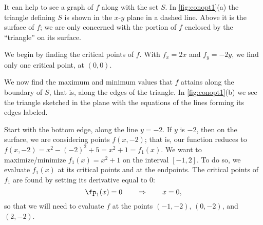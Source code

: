 {It can help to see a graph of $f$ along with the set $S$. In \autoref{fig:conopt1}(a) the triangle defining $S$ is shown in the $x$-$y$ plane in a dashed line. Above it is the surface of $f$; we are only concerned with the portion of $f$ enclosed by the ``triangle'' on its surface. 

We begin by finding the critical points of $f$. With $f_x = 2x$ and $f_y = -2y$, we find only one critical point, at $(0,0)$. 

We now find the maximum and minimum values that $f$ attains along the boundary of $S$, that is, along the edges of the triangle. In \autoref{fig:conopt1}(b) we see the triangle sketched in the plane with the equations of the lines forming its edges labeled. 

Start with the bottom edge, along the line $y=-2$. If $y$ is $-2$, then on the surface, we are considering points $f(x,-2)$; that is, our function reduces to $f(x,-2) = x^2-(-2)^2+5 = x^2+1=f_1(x)$. We want to maximize/minimize $f_1(x)=x^2+1$ on the interval $[-1,2]$. To do so, we evaluate $f_1(x)$ at its critical points and at the endpoints.  The critical points of $f_1$ are found by setting its derivative equal to 0:
\[\fp_1(x)=0\qquad \Rightarrow\qquad x=0,\]
so that we will need to evaluate $f$ at the points $(-1,-2)$, $(0,-2)$, and $(2,-2)$.

}
